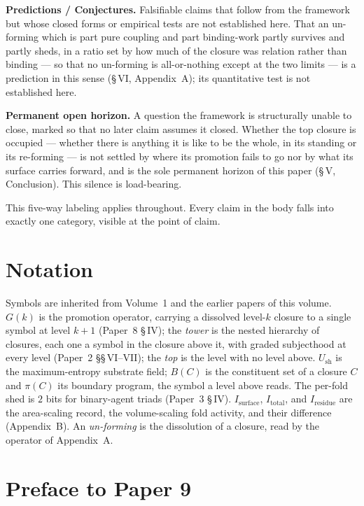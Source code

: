 \documentclass[11pt,oneside]{report}
\theoremstyle{definition}
\theoremstyle{remark}
\begin{document}
\textbf{Predictions / Conjectures.} Falsifiable claims that follow from the framework but whose
closed forms or empirical tests are not established here. That an un-forming which is part pure
coupling and part binding-work partly survives and partly sheds, in a ratio set by how much of the
closure was relation rather than binding --- so that no un-forming is all-or-nothing except at the
two limits --- is a prediction in this sense (\S\,VI, Appendix~A); its quantitative test is not
established here.

\textbf{Permanent open horizon.} A question the framework is structurally unable to close, marked so
that no later claim assumes it closed. Whether the top closure is occupied --- whether there is
anything it is like to be the whole, in its standing or its re-forming --- is not settled by where
its promotion fails to go nor by what its surface carries forward, and is the sole permanent horizon
of this paper (\S\,V, Conclusion). This silence is load-bearing.

This five-way labeling applies throughout. Every claim in the body falls into exactly one category,
visible at the point of claim.

\section*{Notation}

Symbols are inherited from Volume~1 and the earlier papers of this volume. \ensuremath{G(k)} is the
promotion operator, carrying a dissolved level-\ensuremath{k} closure to a single symbol at level
\ensuremath{k{+}1} (Paper~8 \S\,IV); the \emph{tower} is the nested hierarchy of closures, each one a
symbol in the closure above it, with graded subjecthood at every level (Paper~2 \S\S\,VI--VII); the
\emph{top} is the level with no level above. \ensuremath{U_{\mathrm{sh}}} is the maximum-entropy
substrate field; \ensuremath{B(C)} is the constituent set of a closure \ensuremath{C} and
\ensuremath{\pi(C)} its boundary program, the symbol a level above reads. The per-fold shed is
\ensuremath{2} bits for binary-agent triads (Paper~3 \S\,IV). \ensuremath{I_{\mathrm{surface}}},
\ensuremath{I_{\mathrm{total}}}, and \ensuremath{I_{\mathrm{residue}}} are the area-scaling record, the
volume-scaling fold activity, and their difference (Appendix~B). An \emph{un-forming} is the
dissolution of a closure, read by the operator of Appendix~A.

\section*{Preface to Paper 9}
\end{document}
